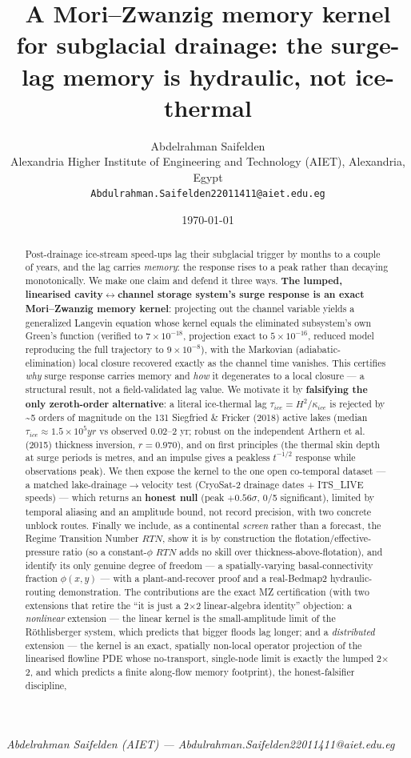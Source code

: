 \documentclass[11pt]{article}
\title{A Mori–Zwanzig memory kernel for subglacial drainage: the surge-lag memory is hydraulic, not ice-thermal}
\author{Abdelrahman Saifelden\\ Alexandria Higher Institute of Engineering and Technology (AIET), Alexandria, Egypt\\ \texttt{Abdulrahman.Saifelden22011411@aiet.edu.eg}}
\date{\today}
\begin{document}
\maketitle

\emph{Abdelrahman Saifelden (AIET) — Abdulrahman.Saifelden22011411@aiet.edu.eg}


\begin{abstract}


Post-drainage ice-stream speed-ups lag their subglacial trigger by months to a couple of years, and the lag carries \emph{memory}: the response rises to a peak rather than decaying monotonically. We make one claim and defend it three ways. \textbf{The lumped, linearised cavity\ensuremath{\leftrightarrow}channel storage system's surge response is an exact Mori–Zwanzig memory kernel}: projecting out the channel variable yields a generalized Langevin equation whose kernel equals the eliminated subsystem's own Green's function (verified to $7\times 10^{-18}$, projection exact to $5\times 10^{-16}$, reduced model reproducing the full trajectory to $9\times 10^{-8}$), with the Markovian (adiabatic-elimination) local closure recovered exactly as the channel time vanishes. This certifies \emph{why} surge response carries memory and \emph{how} it degenerates to a local closure — a structural result, not a field-validated lag value. We motivate it by \textbf{falsifying the only zeroth-order alternative}: a literal ice-thermal lag $\tau _{ice}=H^{2}/\kappa _{ice}$ is rejected by \textasciitilde{}5 orders of magnitude on the 131 Siegfried \& Fricker (2018) active lakes (median $\tau _{ice}\approx 1.5\times 10^{5} yr$ vs observed 0.02–2 yr; robust on the independent Arthern et al. (2015) thickness inversion, $r=0.970$), and on first principles (the thermal skin depth at surge periods is metres, and an impulse gives a peakless $t^{-1/2}$ response while observations peak). We then expose the kernel to the one open co-temporal dataset — a matched lake-drainage\ensuremath{\to}velocity test (CryoSat-2 drainage dates + ITS\_LIVE speeds) — which returns an \textbf{honest null} (peak $+0.56\sigma $, 0/5 significant), limited by temporal aliasing and an amplitude bound, not record precision, with two concrete unblock routes. Finally we include, as a continental \emph{screen} rather than a forecast, the Regime Transition Number $RTN$, show it is by construction the flotation/effective-pressure ratio (so a constant-$\phi $ $RTN$ adds no skill over thickness-above-flotation), and identify its only genuine degree of freedom — a spatially-varying basal-connectivity fraction $\phi (x,y)$ — with a plant-and-recover proof and a real-Bedmap2 hydraulic-routing demonstration. The contributions are the exact MZ certification (with two extensions that retire the ``it is just a 2\ensuremath{\times}2 linear-algebra identity'' objection: a \emph{nonlinear} extension — the linear kernel is the small-amplitude limit of the Röthlisberger system, which predicts that bigger floods lag longer; and a \emph{distributed} extension — the kernel is an exact, spatially non-local operator projection of the linearised flowline PDE whose no-transport, single-node limit is exactly the lumped 2\ensuremath{\times}2, and which predicts a finite along-flow memory footprint), the honest-falsifier discipline, 
\end{abstract}
\end{document}
